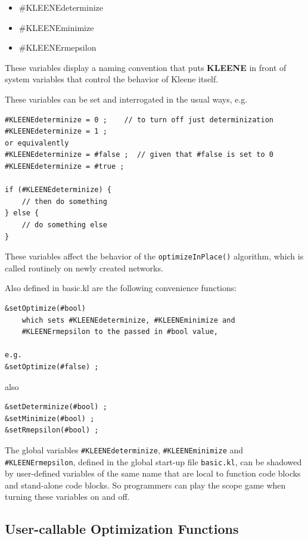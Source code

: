 \documentclass[letterpaper,12pt]{article}
\begin{document}
\begin{itemize}
\item
\#KLEENEdeterminize
\item
\#KLEENEminimize
\item
\#KLEENErmepsilon
\end{itemize}

\noindent
These variables display a naming convention that puts \textbf{KLEENE} in front
of system variables that control the behavior of Kleene itself.

These variables can be set and interrogated in the usual ways, e.g.

\begin{Verbatim}[fontsize=\small]
#KLEENEdeterminize = 0 ;	// to turn off just determinization
#KLEENEdeterminize = 1 ;
or equivalently
#KLEENEdeterminize = #false ;  // given that #false is set to 0
#KLEENEdeterminize = #true ;

if (#KLEENEdeterminize) {
    // then do something
} else {
    // do something else
}
\end{Verbatim}

\noindent 
These variables affect the behavior of the \texttt{optimizeInPlace()}
algorithm, which is called routinely on newly created networks.

Also defined in basic.kl are the following convenience functions:

\begin{Verbatim}[fontsize=\small]
&setOptimize(#bool)
	which sets #KLEENEdeterminize, #KLEENEminimize and
	#KLEENErmepsilon to the passed in #bool value, 
	
e.g.
&setOptimize(#false) ;
\end{Verbatim}

\noindent
also

\begin{Verbatim}[fontsize=\small]
&setDeterminize(#bool) ;
&setMinimize(#bool) ;
&setRmepsilon(#bool) ;
\end{Verbatim}

The global variables \verb!#KLEENEdeterminize!, \verb!#KLEENEminimize!
and \verb!#KLEENErmepsilon!, defined in the global start-up file
\texttt{basic.kl}, can be shadowed by user-defined variables of the same
name that are local to function code blocks and stand-alone code blocks.
So programmers can play the scope game when turning these variables on
and off.

\subsection{User-callable Optimization Functions}
\end{document}
